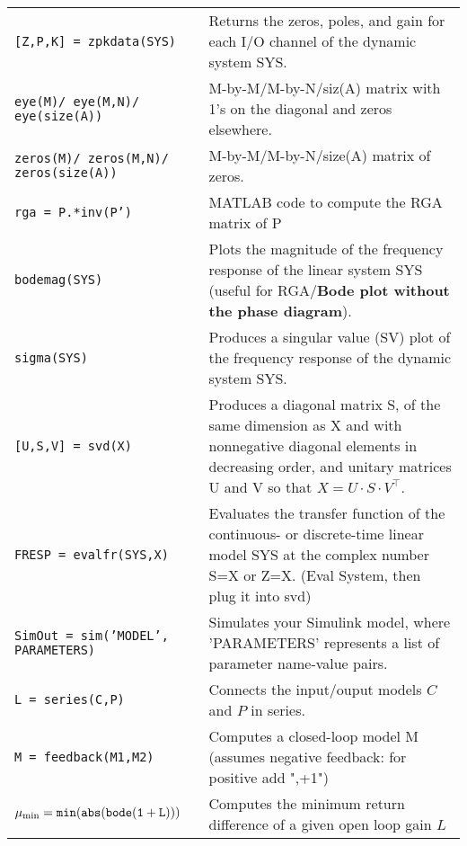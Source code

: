 \begin{center}
\begin{tabular}{p{5cm}|p{8cm}}
        \texttt{[Z,P,K] = zpkdata(SYS)} & Returns the zeros, poles, and gain for each I/O channel of the dynamic system SYS.\\
        
        \texttt{eye(M)/ eye(M,N)/ eye(size(A))}  &  M-by-M/M-by-N/siz(A) matrix with 1's on the diagonal and zeros elsewhere. \\
        
        \texttt{zeros(M)/ zeros(M,N)/ zeros(size(A))}  &  M-by-M/M-by-N/size(A) matrix of zeros.\\
        
        \texttt{rga = P.*inv(P')}  &  MATLAB code to compute the RGA matrix of P\\
        
        \texttt{bodemag(SYS)}  &  Plots the magnitude of the frequency response of the linear system SYS (useful for RGA/\textbf{Bode plot without the phase diagram}). \\
        
        \texttt{sigma(SYS)}  &  Produces a singular value (SV) plot of the frequency response of the dynamic system SYS.\\
        
        \texttt{[U,S,V] = svd(X)}  &  Produces a diagonal matrix S, of the same dimension as X and with nonnegative diagonal elements in decreasing order, and unitary matrices U and V so that $X = U\cdot S\cdot V^\top$.\\
        
        \texttt{FRESP = evalfr(SYS,X)}  & Evaluates the transfer function of the continuous- or discrete-time linear model SYS at the complex number S=X or Z=X. (Eval System, then plug it into svd)\\
        
        \texttt{SimOut = sim('MODEL', PARAMETERS)}  & Simulates your Simulink model, where 'PARAMETERS' represents a list of parameter name-value pairs. \\
        
        \texttt{L = series(C,P)}  & Connects the input/ouput models $C$ and $P$ in series. \\
        
        \texttt{M = feedback(M1,M2)}  &  Computes a closed-loop model M (assumes negative feedback: for positive add ",+1")\\
        
        $\mathtt{\mu_{\textnormal{min}} = min( abs(bode(1 + L)))}$  &  Computes the minimum return difference of a given open loop gain $L$\\
        

\end{tabular}
\end{center}
